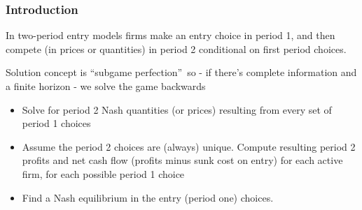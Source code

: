 \documentclass[notes=show]{beamer}
\begin{document}
\begin{frame}%

\frametitle{Introduction}

In two-period entry models firms make an entry choice in period 1, and then
compete (in prices or quantities) in period 2 conditional on first period
choices.

Solution concept is \textquotedblleft subgame perfection\textquotedblright\
so - if there's complete information and a finite horizon - we solve the
game backwards

\begin{itemize}
\item Solve for period 2 Nash quantities (or prices) resulting from every
set of period 1 choices

\item Assume the period 2 choices are (always) unique. Compute resulting
period 2 profits and net cash flow (profits minus sunk cost on entry) for
each active firm, for each possible period 1 choice

\item Find a Nash equilibrium in the entry (period one) choices.
\end{itemize}

\end{frame}%
\end{document}

